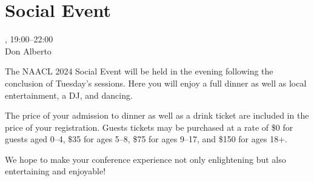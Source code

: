 \clearpage
\section{Social Event}
\setheaders{}{\daydateyear}

\begin{center}



\daydateyear, 19:00--22:00 \vspace{1em}\\
Don Alberto\\
\end{center}

The NAACL 2024 Social Event will be held in the evening following the
conclusion of Tuesday's sessions. Here you will enjoy a full dinner
as well as local entertainment, a DJ, and dancing.

The price of your admission to dinner as well as a drink ticket
are included in the price of your registration. Guests tickets may be
purchased at a rate of \$0 for guests aged 0--4, \$35 for ages 5--8,
\$75 for ages 9--17, and \$150 for ages 18+.

We hope to make your conference experience not only enlightening but
also entertaining and enjoyable! 
